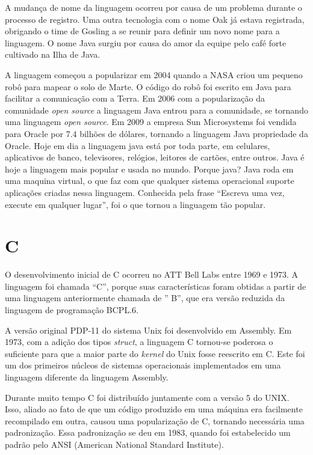 \documentclass[
    12pt,               %
    openright,          %
    twoside,            %
    a4paper,            %
    brazil              %
    ]{abntex2}
\begin{document}
A mudança de nome da linguagem ocorreu por causa de um problema durante o
processo de registro.  Uma outra tecnologia com o nome Oak já estava
registrada, obrigando o time de Gosling a se reunir para definir um novo nome
para a linguagem. O nome Java surgiu por causa do amor da equipe pelo café
forte cultivado na Ilha de Java. \cite{CursoJava}

A linguagem começou a popularizar em 2004 quando a NASA criou um pequeno robô
para mapear o solo de Marte. O código do robô foi escrito em Java para
facilitar a comunicação com a Terra. Em 2006 com a popularização da comunidade
\textit{open source} a linguagem Java entrou para a comunidade, se tornando uma
linguagem \textit{open source}.  Em 2009 a empresa Sun Microsystems foi vendida
para Oracle por 7.4 bilhões de dólares, tornando a linguagem Java propriedade
da Oracle. Hoje em dia a linguagem java está por toda parte, em celulares,
aplicativos de banco, televisores, relógios, leitores de cartões, entre outros.
Java é hoje a linguagem mais popular e usada no mundo.  Porque java?  Java roda
em uma maquina virtual, o que faz com que qualquer sistema operacional suporte
aplicações criadas nessa linguagem. Conhecida pela frase “Escreva uma vez,
execute em qualquer lugar”, foi o que tornou a linguagem tão popular.
\cite{JavaWiki} 


\section{C}

O desenvolvimento inicial de C ocorreu no ATT Bell Labs entre 1969 e 1973. A
linguagem foi chamada “C”, porque suas características foram obtidas a partir
de uma linguagem anteriormente chamada de ” B”, que era versão reduzida da
linguagem de programação BCPL.6.

A versão original PDP-11 do sistema Unix foi desenvolvido em Assembly. Em 1973,
com a adição dos tipos \textit{struct}, a linguagem C tornou-se poderosa o
suficiente para que a maior parte do \textit{kernel} do Unix fosse reescrito em
C. Este foi um dos primeiros núcleos de sistemas operacionais implementados em
uma linguagem diferente da linguagem Assembly. 

Durante muito tempo C foi distribuído juntamente com a versão 5 do UNIX. Isso,
aliado ao fato de que um código produzido em uma máquina era facilmente
recompilado em outra, causou uma popularização de C, tornando necessária uma
padronização. Essa padronização se deu em 1983, quando foi estabelecido um
padrão pelo ANSI (American National Standard Institute).
\end{document}
